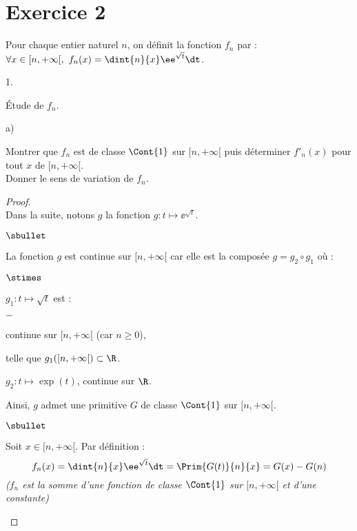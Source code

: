 \documentclass[11pt]{article}%
\begin{document}
\section*{Exercice 2}
\noindent
Pour chaque entier naturel $n$, on définit la fonction $f_{n}$ par :
$\forall x\in[n, + \infty[, \ f_{n}(x) = \dint{n}{x} \ee^{\sqrt{t}} \dt$.
\begin{noliste}{1.}
  \setlength{\itemsep}{4mm}
\item Étude de $f_{n}$.
  \begin{noliste}{a)}
    \setlength{\itemsep}{2mm}
  \item Montrer que $f_{n}$ est de classe $\Cont{1}$ sur $[n, +
    \infty[$ puis déterminer $f'_{n}(x)$ pour tout $x$ de $[n,
    +\infty[$.\\
    Donner le sens de variation de $f_{n}$.

    \begin{proof}~\\%
      Dans la suite, notons $g$ la fonction $g : t \mapsto
      \ee^{\sqrt{t}}$.%
      \begin{noliste}{$\sbullet$}
      \item La fonction $g$ est continue sur $[n, +\infty[$ car elle
        est la composée $g = g_2 \circ g_1$ où :
      \end{noliste}
      \begin{noliste}{$\stimes$}
      \item $g_1 : t \mapsto \sqrt{t}$ est :
        \begin{liste}{$-$}
        \item continue sur $[n, +\infty[$ (car $n \geq 0$),
        \item telle que $g_1([n, +\infty[) \subset \R$.
        \end{liste}
      \item $g_2 : t \mapsto \exp(t)$, continue sur $\R$.
      \end{noliste}
      Ainsi, $g$ admet une primitive $G$ de classe $\Cont{1}$ sur $[n,
      +\infty[$.
      \begin{noliste}{$\sbullet$}
      \item Soit $x \in [n, +\infty[$. Par définition :
        \[
        f_n(x) = \dint{n}{x} \ee^{\sqrt{t}} \dt = \Prim{G(t)}{n}{x} =
        G(x)- G(n)
        \]        
        \conc{La fonction $f_n$ est de classe $\Cont{1}$ sur
          $[n,+\infty[$ car $G$ l'est.}%
        {\it ($f_n$ est la somme d'une fonction de classe $\Cont{1}$
          sur $[n,+\infty[$ et d'une constante)}%


\end{noliste}
\end{proof}
\end{noliste}
\end{noliste}
\end{document}
